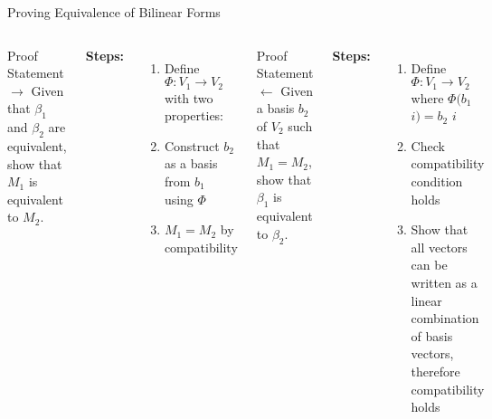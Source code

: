 \documentclass[svgnames]{beamer}
\begin{document}
\begin{frame}{Proving Equivalence of Bilinear Forms}
    \vspace{0 cm}
\begin{columns}[T]
    {\scriptsize
    \begin{block}{Proof Statement $\rightarrow$}
    Given that $\beta_1$ and $\beta_2$ are equivalent, show that $M_1$ is equivalent to $M_2$.
    \end{block}
    
    \textbf{Steps:}
    }
    {\scriptsize
    \begin{enumerate}
        \item Define $\Phi : V_1 \rightarrow V_2$ with two properties:
        \item Construct $b_2$ as a basis from $b_1$ using $\Phi$
        \item $M_1 = M_2$ by compatibility
    \end{enumerate}
    }

    {\scriptsize
    \begin{block}{Proof Statement $\leftarrow$}
    Given a basis $b_2$ of $V_2$ such that $M_1 = M_2$, show that $\beta_1$ is equivalent to $\beta_2$.
    \end{block}
    }
    {\scriptsize
    \textbf {Steps:}
    \begin{enumerate}
        \item Define $\Phi : V_1 \rightarrow V_2$ where $\Phi (b_1$ $i) = b_2$ $i$
        \item Check compatibility condition holds
        \item Show that all vectors can be written as a linear combination of basis vectors, therefore compatibility holds
    \end{enumerate}
    }
\end{columns}
\end{frame}
\end{document}
